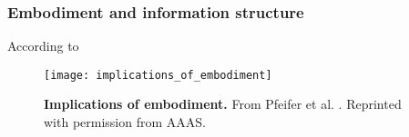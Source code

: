 %
%
%



\subsubsection{Embodiment and information structure}
\TODO
According to \cite{LungarellaEmbodimentInformationCausal}






\begin{figure}
	\begin{center}
		\texttt{[image: implications\_of\_embodiment]}
		\caption{\textbf{Implications of embodiment.} From Pfeifer et al. \cite{Pfeifer2007SelfOrganizationEmbodiment}. Reprinted with permission from AAAS.}
	\end{center}
\end{figure}


